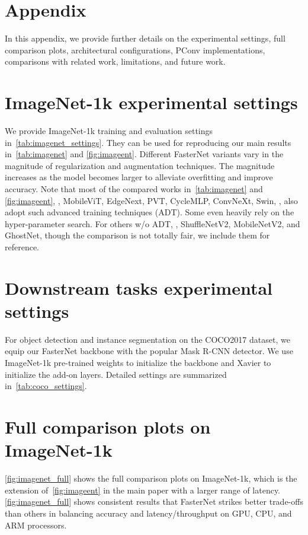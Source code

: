 \appendix
{}
\section*{\Large Appendix}
In this appendix, we provide further details on the experimental settings, full comparison plots, architectural configurations, PConv implementations, comparisons with related work, limitations, and future work.

\section{ImageNet-1k experimental settings}
\label{imagenet_settings}
We provide ImageNet-1k training and evaluation settings in~\cref{tab:imagenet_settings}. They can be used for reproducing our main results in~\cref{tab:imagenet} and \cref{fig:imageent}. Different FasterNet variants vary in the magnitude of regularization and augmentation techniques. The magnitude increases as the model becomes larger to alleviate overfitting and improve accuracy. Note that most of the compared works in~\cref{tab:imagenet} and \cref{fig:imageent}, \eg, MobileViT, EdgeNext, PVT, CycleMLP, ConvNeXt, Swin, \etc, also adopt such advanced training techniques (ADT). Some even heavily rely on the hyper-parameter search. For others w/o ADT, \ie, ShuffleNetV2, MobileNetV2, and GhostNet, though the comparison is not totally fair, we include them for reference.

\section{Downstream tasks experimental settings}
For object detection and instance segmentation on the COCO2017 dataset, we equip our FasterNet backbone with the popular Mask R-CNN detector. 
We use ImageNet-1k pre-trained weights to initialize the backbone and Xavier to initialize the add-on layers. Detailed settings are summarized in~\cref{tab:coco_settings}.

\section{Full comparison plots on ImageNet-1k}
\cref{fig:imagenet_full} shows the full comparison plots on ImageNet-1k, which is the extension of~\cref{fig:imageent} in the main paper with a larger range of latency. \cref{fig:imagenet_full} shows consistent results that FasterNet strikes better trade-offs than others in balancing accuracy and latency/throughput on GPU, CPU, and ARM processors.


